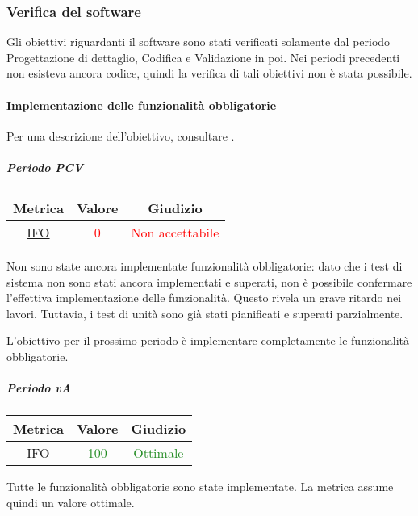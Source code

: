 		\subsubsection{Verifica del software}
			Gli obiettivi riguardanti il software sono stati verificati solamente dal periodo Progettazione di dettaglio, Codifica e Validazione in poi. Nei periodi precedenti non esisteva ancora codice, quindi la verifica di tali obiettivi non è stata possibile.
			
			\paragraph{Implementazione delle funzionalità obbligatorie}
			Per una descrizione dell'obiettivo, consultare .
				\subparagraph{Periodo PCV}
			\begin{table}[H]
				\centering
				\begin{tabular}{  c | c | c}
					\hline
					\textbf{Metrica} & \textbf{Valore} & \textbf{Giudizio} \\
					\hline
					\hyperref[MMC]{IFO}   & \textcolor{Red}{0}          & \textcolor{Red}{Non accettabile}  \\ \hline
				\end{tabular} 
			\end{table}
					Non sono state ancora implementate funzionalità obbligatorie: dato che i test di sistema non sono stati ancora implementati e superati, non è possibile confermare l'effettiva implementazione delle funzionalità. Questo rivela un grave ritardo nei lavori. Tuttavia, i test di unità sono già stati pianificati e superati parzialmente. 
					
					L'obiettivo per il prossimo periodo è implementare completamente le funzionalità obbligatorie.
					
						\subparagraph{Periodo vA}
					\begin{table}[H]
						\centering
						\begin{tabular}{  c | c | c}
							\hline
							\textbf{Metrica} & \textbf{Valore} & \textbf{Giudizio} \\
							\hline
							\hyperref[MMC]{IFO}   & \textcolor{ForestGreen}{100}          & \textcolor{ForestGreen}{Ottimale}  \\ \hline
						\end{tabular} 
					\end{table}
					Tutte le funzionalità obbligatorie sono state implementate. La metrica assume quindi un valore ottimale.
			
